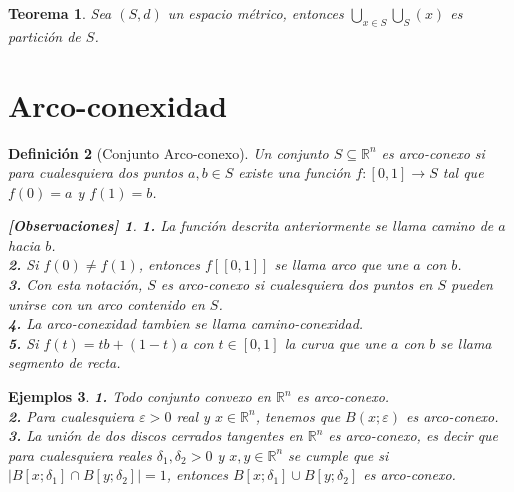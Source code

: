 \documentclass[oneside]{book} %
\theoremstyle{Teorema}
\newtheorem{Definicion}{Definición}[chapter]
\newtheorem{Teorema}[Definicion]{Teorema}
\theoremstyle{Ejemplos}
\newtheorem{Ejemplos}[Definicion]{Ejemplos}
\theoremstyle{[Obs]}
\newtheorem*{Obs}{[Observaciones]}
\newcommand{\abs}[1]{\left|#1\right|} %
\renewcommand{\{}{\left\lbrace} %
\renewcommand{\}}{\right\rbrace} %
\renewcommand{\u}{\cup} %
\newcommand{\n}{\cap} %
\newcommand{\U}{\bigcup} %
\renewcommand{\sc}{\subseteq} %
\newcommand{\Rn}{\mathbb{R}^n} %
\begin{document}
			\begin{Teorema}

				Sea $(S, d)$ un espacio métrico, entonces $\displaystyle\U_{x \in S}\textstyle\U_{S}(x)$ es partición de $S$. \\

			\end{Teorema}

		\section{Arco-conexidad}

			\begin{Definicion}[Conjunto Arco-conexo]
				
				Un conjunto $S \sc \Rn$ es arco-conexo si para cualesquiera dos puntos $a, b \in S$ existe una función $f : [0, 1] \to S$ tal que $f(0) = a$ y $f(1) = b$. \\

				\begin{Obs}
				
					\hfill
				
					\textbf{1.} La función descrita anteriormente se llama camino de $a$ hacia $b$. \\

					\textbf{2.} Si $f(0) \neq f(1)$, entonces $f[[0,1]]$ se llama arco que une $a$ con $b$. \\

					\textbf{3.} Con esta notación, $S$ es arco-conexo si cualesquiera dos puntos en $S$ pueden unirse con un arco contenido en $S$. \\

					\textbf{4.} La arco-conexidad tambien se llama camino-conexidad. \\

					\textbf{5.} Si $f(t) = tb + (1 - t)a$ con $t \in [0, 1]$ la curva que une $a$ con $b$ se llama segmento de recta. \\
				
				\end{Obs}

			\end{Definicion}

			\begin{Ejemplos}
				
				\hfill 

				\textbf{1.} Todo conjunto convexo en $\Rn$ es arco-conexo. \\

				\textbf{2.} Para cualesquiera $\varepsilon > 0$ real y $x \in \Rn$, tenemos que $B(x;\varepsilon)$ es arco-conexo. \\

				\textbf{3.} La unión de dos discos cerrados tangentes en $\Rn$ es arco-conexo, es decir que para cualesquiera reales $\delta_1, \delta_2 > 0$ y $x, y \in \Rn$ se cumple que si $\abs{B[x;\delta_1] \n B[y;\delta_2]} = 1$, entonces $B[x;\delta_1] \u B[y;\delta_2]$ es arco-conexo. \\
	
			\end{Ejemplos}
\end{document}
